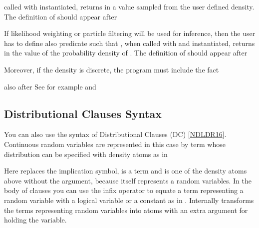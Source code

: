 \documentclass[letterpaper,10pt,english]{sphinxmanual}
\begin{document}
\sphinxAtStartPar
called with  instantiated, returns in  a value sampled from the user defined density.
The definition of  should appear after 

\sphinxAtStartPar
If likelihood weighting or particle filtering will be used for inference, then the user has to define also predicate  such that , when called with  and  instantiated, returns in  the value of the probability density of . The definition of  should appear after 

\sphinxAtStartPar
Moreover, if the density is discrete, the program must include the fact

\begin{sphinxVerbatim}[commandchars=\\\{\}]
\end{sphinxVerbatim}

\sphinxAtStartPar
also after 
See for example  and 


\subsection{Distributional Clauses Syntax}
\label{\detokenize{index:distributional-clauses-syntax}}
\sphinxAtStartPar
You can also use the syntax of Distributional Clauses (DC) {[}\hyperlink{cite.index:id48}{NDLDR16}{]}.
Continuous random variables are represented in this case by term whose distribution can be specified with density atoms as in

\begin{sphinxVerbatim}[commandchars=\\\{\}]
  
\end{sphinxVerbatim}

\sphinxAtStartPar
Here \sphinxcode{\sphinxupquote{:=}} replaces the implication symbol,  is a term and  is one of the density atoms above without the  argument, because  itself represents a random variables.
In the body of clauses you can use the infix operator \sphinxcode{\sphinxupquote{\textasciitilde{}=}} to equate a term representing a random variable with a logical variable or a constant as in .
Internally  transforms the terms representing random variables into atoms with an extra argument for holding the variable.
\end{document}
